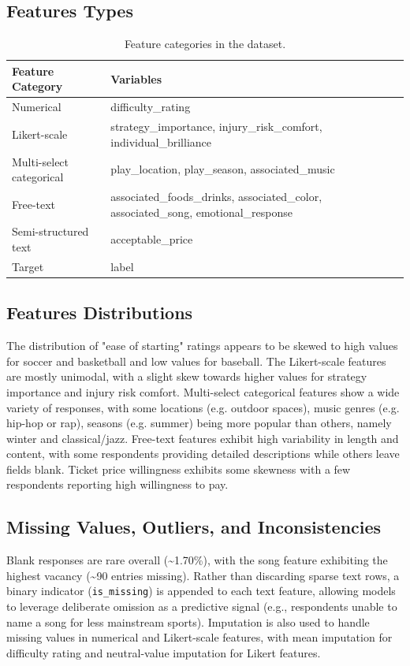 \documentclass[12pt]{article}
\begin{document}
\subsection*{Features Types}
\begin{table}[H] \centering \caption{Feature categories in the dataset.} \label{tab:feature_types} \footnotesize \begin{tabular}{p{3cm} p{13cm}} \toprule \textbf{Feature Category} & \textbf{Variables} \\ \midrule Numerical & difficulty\_rating \\ Likert-scale & strategy\_importance, injury\_risk\_comfort, individual\_brilliance \\ Multi-select categorical & play\_location, play\_season, associated\_music \\ Free-text & associated\_foods\_drinks, associated\_color, associated\_song, emotional\_response \\ Semi-structured text & acceptable\_price \\ Target & label \\ \bottomrule \end{tabular} \end{table}


\subsection*{Features Distributions}
The distribution of "ease of starting" ratings appears to be skewed to high values for soccer and basketball and low values for baseball. The Likert-scale features are mostly unimodal, with a slight skew towards higher values for strategy importance and injury risk comfort. Multi-select categorical features show a wide variety of responses, with some locations (e.g. outdoor spaces), music genres (e.g. hip-hop or rap), seasons (e.g. summer) being more popular than others, namely winter and classical/jazz. Free-text features exhibit high variability in length and content, with some respondents providing detailed descriptions while others leave fields blank. Ticket price willingness exhibits some skewness with a few respondents reporting high willingness to pay.


\subsection*{Missing Values, Outliers, and Inconsistencies}
Blank responses are rare overall (\textasciitilde 1.70\%), with the song feature exhibiting the highest vacancy (\textasciitilde 90 entries missing). Rather than discarding sparse text rows, a binary indicator (\texttt{is\_missing}) is appended to each text feature, allowing models to leverage deliberate omission as a predictive signal (e.g., respondents unable to name a song for less mainstream sports). Imputation is also used to handle missing values in numerical and Likert-scale features, with mean imputation for difficulty rating and neutral-value imputation for Likert features. 
\end{document}
